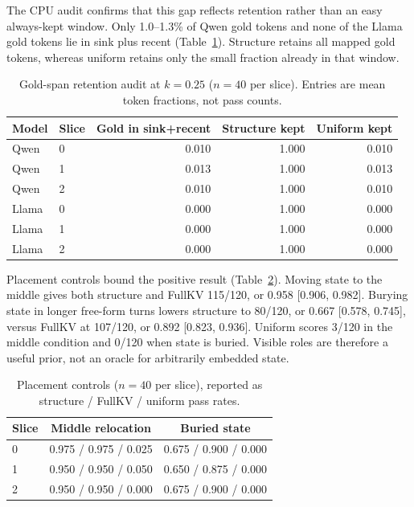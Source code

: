 \documentclass[10pt]{article}
\begin{document}
The CPU audit confirms that this gap reflects retention rather than an easy
always-kept window.  Only 1.0--1.3\% of Qwen gold tokens and none of the Llama
gold tokens lie in sink plus recent (Table~\ref{tab:audit}).  Structure retains
all mapped gold tokens, whereas uniform retains only the small fraction already
in that window.

\begin{table}[!htbp]
  \centering
  \caption{Gold-span retention audit at $k=0.25$ ($n=40$ per slice).  Entries
  are mean token fractions, not pass counts.}
  \label{tab:audit}
  \begin{tabular}{llrrr}
    \toprule
    Model & Slice & Gold in sink+recent & Structure kept & Uniform kept \\
    \midrule
    Qwen & 0 & 0.010 & 1.000 & 0.010 \\
    Qwen & 1 & 0.013 & 1.000 & 0.013 \\
    Qwen & 2 & 0.010 & 1.000 & 0.010 \\
    Llama & 0 & 0.000 & 1.000 & 0.000 \\
    Llama & 1 & 0.000 & 1.000 & 0.000 \\
    Llama & 2 & 0.000 & 1.000 & 0.000 \\
    \bottomrule
  \end{tabular}
\end{table}

Placement controls bound the positive result (Table~\ref{tab:placement}).
Moving state to the middle gives both structure and FullKV 115/120, or 0.958
[0.906, 0.982].  Burying state in longer free-form turns lowers structure to
80/120, or 0.667 [0.578, 0.745], versus FullKV at 107/120, or 0.892
[0.823, 0.936].  Uniform scores 3/120 in the middle condition and 0/120 when
state is buried.  Visible roles are therefore a useful prior, not an oracle for
arbitrarily embedded state.

\begin{table}[!htbp]
  \centering
  \caption{Placement controls ($n=40$ per slice), reported as structure / FullKV
  / uniform pass rates.}
  \label{tab:placement}
  \begin{tabular}{lcc}
    \toprule
    Slice & Middle relocation & Buried state \\
    \midrule
    0 & 0.975 / 0.975 / 0.025 & 0.675 / 0.900 / 0.000 \\
    1 & 0.950 / 0.950 / 0.050 & 0.650 / 0.875 / 0.000 \\
    2 & 0.950 / 0.950 / 0.000 & 0.675 / 0.900 / 0.000 \\
    \bottomrule
  \end{tabular}
\end{table}
\end{document}
